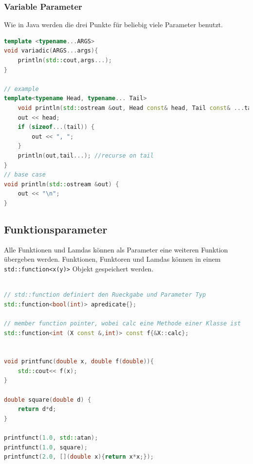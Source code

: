 \subsubsection{Variable Parameter}
Wie in Java werden die drei Punkte für beliebig viele Parameter benutzt.
\begin{lstlisting}[language=C++]
template <typename...ARGS>
void variadic(ARGS...args){
	println(std::cout,args...);
}

// example
template<typename Head, typename... Tail>
	void println(std::ostream &out, Head const& head, Tail const& ...tail) {
	out << head;
	if (sizeof...(tail)) {
		out << ", ";
	}
	println(out,tail...); //recurse on tail
}
// base case
void println(std::ostream &out) {
	out << "\n";
}
\end{lstlisting}

\clearpage

\subsection{Funktionsparameter}
Alle Funktionen und Lamdas können als Parameter eine weiteren Funktion übergeben werden. Funktionen, Funktoren und Lamdas können in einem \lstinline|std::function<x(y)>| Objekt gespeichert werden.
\newpage

\begin{lstlisting}[language=C++]

// std::function definiert den Rueckgabe und Parameter Typ
std::function<bool(int)> apredicate{};

// member function pointer, wobei calc eine Methode einer Klasse ist
std::function<int (X const &,int)> const f{&X::calc};


void printfunc(double x, double f(double)){
	std::cout<< f(x);
}

double square(double d) {
	return d*d;
}

printfunct(1.0, std::atan);
printfunct(1.0, square);
printfunct(2.0, [](double x){return x*x;});
\end{lstlisting}

